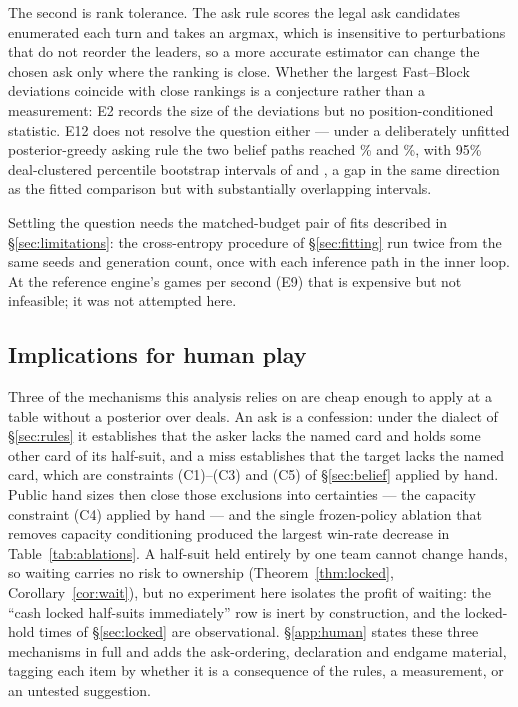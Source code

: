 The second is rank tolerance. The ask rule scores the legal ask candidates
enumerated each turn and takes an argmax, which is insensitive to perturbations
that do not reorder the leaders, so a more accurate estimator can change the
chosen ask only where the ranking is close. Whether the largest Fast--Block
deviations coincide with close rankings is a conjecture rather than a
measurement: E2 records the size of the deviations but no position-conditioned
statistic. E12 does not resolve the question either --- under a deliberately
unfitted posterior-greedy asking rule the two belief paths reached
\numETwelveFast\% and \numETwelveBlock\%, with 95\% deal-clustered percentile
bootstrap intervals of \numETwelveFastCI{} and \numETwelveBlockCI{}, a gap in the
same direction as the fitted comparison but with substantially overlapping
intervals.

Settling the question needs the matched-budget pair of fits described in
\S\ref{sec:limitations}: the cross-entropy procedure of \S\ref{sec:fitting} run
twice from the same seeds and generation count, once with each inference path in
the inner loop. At the reference engine's \numThroughputBlock{} games per second
(E9) that is expensive but not infeasible; it was not attempted here.

\subsection{Implications for human play}
\label{sec:humanplay}

Three of the mechanisms this analysis relies on are cheap enough to apply at a
table without a posterior over deals. An ask is a confession: under the dialect
of \S\ref{sec:rules} it establishes that the asker lacks the named card and holds
some other card of its half-suit, and a miss establishes that the target lacks
the named card, which are constraints (C1)--(C3) and (C5) of \S\ref{sec:belief}
applied by hand. Public hand sizes then close those exclusions into certainties
--- the capacity constraint (C4) applied by hand --- and the single frozen-policy
ablation that removes capacity conditioning produced the largest win-rate
decrease in Table~\ref{tab:ablations}. A half-suit held entirely by one team
cannot change hands, so waiting carries no risk to ownership
(Theorem~\ref{thm:locked}, Corollary~\ref{cor:wait}), but no experiment here
isolates the profit of waiting: the ``cash locked half-suits immediately'' row is
inert by construction, and the locked-hold times of \S\ref{sec:locked} are
observational. \S\ref{app:human} states these three mechanisms in full and adds
the ask-ordering, declaration and endgame material, tagging each item by whether
it is a consequence of the rules, a measurement, or an untested suggestion.
